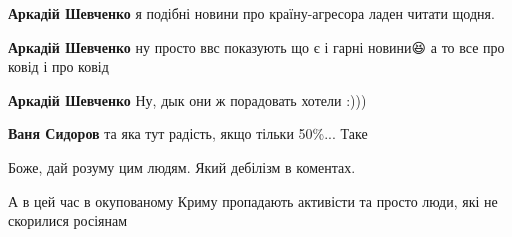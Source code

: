 \begin{itemize}
\begin{itemize}
\textbf{Аркадій Шевченко} я подібні новини про країну-агресора ладен читати щодня.

 
\textbf{Аркадій Шевченко} ну просто ввс показують що є і гарні новини😆 а то все про ковід і про ковід

 
\textbf{Аркадій Шевченко} Ну, дык они ж порадовать хотели :)))

\begin{itemize}
 
\textbf{Ваня Сидоров} та яка тут радість, якщо тільки 50\%... Таке
\end{itemize}

\end{itemize}

 
Боже, дай розуму цим людям. Який дебілізм в коментах.

 
А в цей час в окупованому Криму пропадають активісти та просто люди, які не скорилися росіянам

 

\end{itemize}
